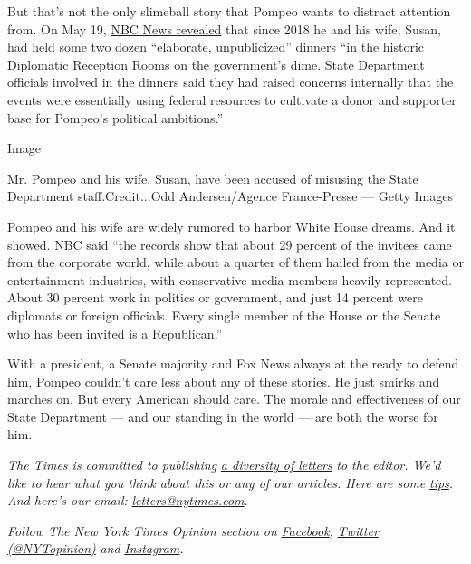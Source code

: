 But that's not the only slimeball story that Pompeo wants to distract
attention from. On May 19,
\href{https://www.nbcnews.com/politics/politics-news/pompeo-s-elite-taxpayer-funded-dinners-raise-new-concerns-n1210746}{NBC
News revealed} that since 2018 he and his wife, Susan, had held some two
dozen ``elaborate, unpublicized'' dinners ``in the historic Diplomatic
Reception Rooms on the government's dime. State Department officials
involved in the dinners said they had raised concerns internally that
the events were essentially using federal resources to cultivate a donor
and supporter base for Pompeo's political ambitions.''

Image

Mr. Pompeo and his wife, Susan, have been accused of misusing the State
Department staff.Credit...Odd Andersen/Agence France-Presse --- Getty
Images

Pompeo and his wife are widely rumored to harbor White House dreams. And
it showed. NBC said ``the records show that about 29 percent of the
invitees came from the corporate world, while about a quarter of them
hailed from the media or entertainment industries, with conservative
media members heavily represented. About 30 percent work in politics or
government, and just 14 percent were diplomats or foreign officials.
Every single member of the House or the Senate who has been invited is a
Republican.''

With a president, a Senate majority and Fox News always at the ready to
defend him, Pompeo couldn't care less about any of these stories. He
just smirks and marches on. But every American should care. The morale
and effectiveness of our State Department --- and our standing in the
world --- are both the worse for him.

\emph{The Times is committed to publishing}
\href{https://www.nytimes.com/2019/01/31/opinion/letters/letters-to-editor-new-york-times-women.html}{\emph{a
diversity of letters}} \emph{to the editor. We'd like to hear what you
think about this or any of our articles. Here are some}
\href{https://help.nytimes.com/hc/en-us/articles/115014925288-How-to-submit-a-letter-to-the-editor}{\emph{tips}}\emph{.
And here's our email:}
\href{mailto:letters@nytimes.com}{\emph{letters@nytimes.com}}\emph{.}

\emph{Follow The New York Times Opinion section on}
\href{https://www.facebook.com/nytopinion}{\emph{Facebook}}\emph{,}
\href{http://twitter.com/NYTOpinion}{\emph{Twitter (@NYTopinion)}}
\emph{and}
\href{https://www.instagram.com/nytopinion/}{\emph{Instagram}}\emph{.}

